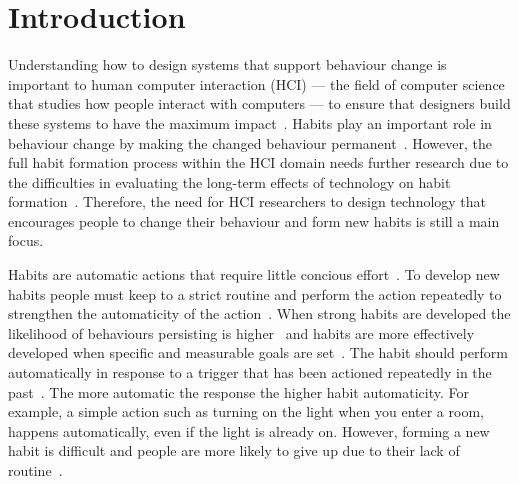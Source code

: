 
\section{Introduction}
Understanding how to design systems that support behaviour change is important to human computer interaction (HCI) --- the field of computer science that studies how people interact with computers --- to ensure that designers build these systems to have the maximum impact~\cite{article_evaluate_tech_health_behaviour_change}. Habits play an important role in behaviour change by making the changed behaviour permanent~\cite{article_promoting_habit_formation}. However, the full habit formation process within the HCI domain needs further research due to the difficulties in evaluating the long-term effects of technology on habit formation~\cite{article_evaluate_tech_health_behaviour_change}. Therefore, the need for HCI researchers to design technology that encourages people to change their behaviour and form new habits is still a main focus.

Habits are automatic actions that require little concious effort~\cite{article_the_habitual_consumer}. To develop new habits people must keep to a strict routine and perform the action repeatedly to strengthen the automaticity of the action~\cite{article_promoting_habit_formation}. When strong habits are developed the likelihood of behaviours persisting is higher~\cite{putting_habit_into_practice} and habits are more effectively developed when specific and measurable goals are set~\cite{habits_better_when_have_specific_and_measurable_goals}. The habit should perform automatically in response to a trigger that has been actioned repeatedly in the past~\cite{article_the_habitual_consumer}. The more automatic the response the higher habit automaticity. For example, a simple action such as turning on the light when you enter a room, happens automatically, even if the light is already on. However, forming a new habit is difficult and people are more likely to give up due to their lack of routine~\cite{article_promoting_habit_formation, article_the_habitual_consumer}.

